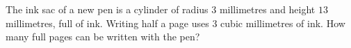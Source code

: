 The ink sac of a new pen is a cylinder of radius $3$ millimetres and height $13$ millimetres, full of ink. Writing half a page uses $3$ cubic millimetres of ink. How many full pages can be written with the pen?

